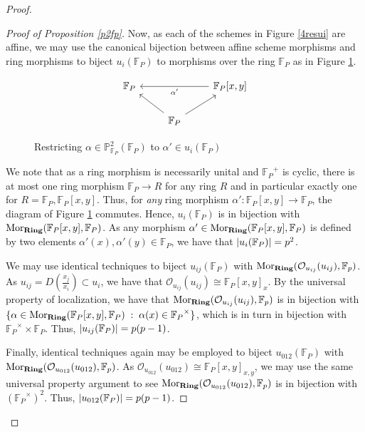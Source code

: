 \documentclass[english,letter,doublesided]{article}
\newcommand{\mor}{\mathrm{Mor}}
\DeclarePairedDelimiter\abs{\lvert}{\rvert}%
\newcommand{\OO}{\mathcal{O}}
\newcommand{\FF}{\mathbb{F}}
\newcommand{\PP}{\mathbb{P}}
\newenvironment{subproof}[1][\proofname]{%
	\renewcommand{\qedsymbol}{$\blacksquare$}%
	\begin{proof}[#1]%
	}{%
	\end{proof}%
}
\theoremstyle{remark}
\theoremstyle{definition}
\newcommand{\cat}[1]{{\mathrm{\bf{#1}}}}
\newcommand{\Fp}{{\FF_P}}
\begin{document}
\begin{proof}
\begin{subproof}[Proof of Proposition \ref{p2fp}]
Now, as each of the schemes in Figure \ref{4resui} are affine, we may use the canonical bijection between affine scheme morphisms and ring morphisms to biject $u_i(\Fp)$ to morphisms over the ring $\Fp$ as in Figure \ref{4resr}.\begin{figure}[h!]\begin{centering}
	$$\begin{tikzcd}
\Fp&&\Fp[x,y]\arrow[ll,"\alpha'"]\\& \Fp \arrow[ur]\arrow[ul]&
	\end{tikzcd}$$\caption{Restricting $\alpha\in \PP^2_\Fp(\Fp)$ to $\alpha'\in u_i(\Fp)$ \label{4resr}}\end{centering}
\end{figure}

We note that as a ring morphism is necessarily unital and $\Fp^+$ is cyclic, there is at most one ring morphism $\Fp\to R$ for any ring $R$ and in particular exactly one for $R=\Fp,\Fp[x,y]$. Thus, for \textit{any} ring morphism $\alpha':\Fp[x,y]\to \Fp$, the diagram of Figure \ref{4resr} commutes. Hence, $u_i(\Fp)$ is in bijection with $\mor_\cat{Ring}(\Fp[x,y],\Fp)$. As any morphism $\alpha'\in \mor_\cat{Ring}(\Fp[x,y],\Fp)$ is defined by two elements $\alpha'(x),\alpha'(y)\in \Fp$, we have that $\abs{u_i(\Fp)}=p^2$. 

We may use identical techniques to biject $u_{ij}(\Fp)$ with $\mor_\cat{Ring}(\OO_{u_{ij}}(u_{ij}),\FF_p)$. As $u_{ij}=D(\frac{x_j}{x_i})\subset u_i$, we have that $\OO_{u_{ij}}(u_{ij})\cong \Fp[x,y]_x$. By the universal property of localization, we have that $\mor_\cat{Ring}(\OO_{u_{ij}}(u_{ij}),\FF_p)$ is in bijection with $\{\alpha\in \mor_{\cat{Ring}}(\Fp[x,y],\Fp)\;:\;\alpha(x)\in \Fp^\times\}$, which is in turn in bijection with $\Fp^\times \times \Fp$. Thus, $\abs{u_{ij}(\Fp)}=p(p-1)$.

Finally, identical techniques again may be employed to biject $u_{012}(\Fp)$ with $\mor_\cat{Ring}(\OO_{u_{012}}(u_{012}),\FF_p)$. As $\OO_{u_{012}}(u_{012})\cong \Fp[x,y]_{x,y}$, we may use the same universal property argument to see $\mor_\cat{Ring}(\OO_{u_{012}}(u_{012}),\FF_p)$ is in bijection with $(\Fp^\times)^2$. Thus, $\abs{u_{012}(\Fp)}=p(p-1)$.


\end{subproof}
\end{proof}
\end{document}
